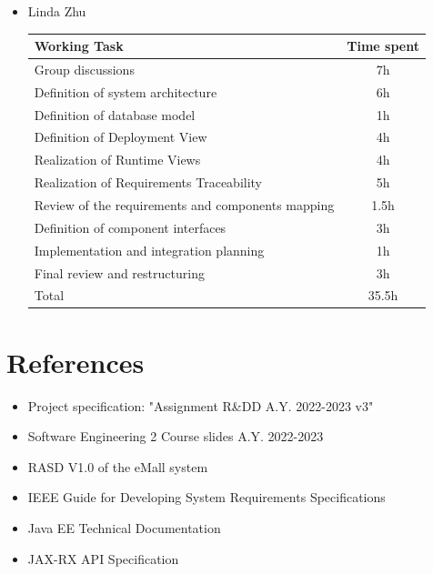 \documentclass[12pt]{article}
\begin{document}
\begin{itemize}
\newpage
    \item Linda Zhu {
    \begin{center}
    \begin{tabular}{| l | c |}
    \hline
    Working Task & Time spent \\
    \hline
    Group discussions & 7h \\
    \hline
    Definition of system architecture & 6h \\
    \hline
    Definition of database model & 1h \\
    \hline
    Definition of Deployment View & 4h \\
    \hline
    Realization of Runtime Views & 4h \\
    \hline
    Realization of Requirements Traceability & 5h \\
    \hline
    Review of the requirements and components mapping & 1.5h \\
    \hline
    Definition of component interfaces & 3h \\
    \hline
    Implementation and integration planning & 1h \\
    \hline
    Final review and restructuring & 3h \\
    \hline
    Total & 35.5h \\
    \hline
    \end{tabular}
    \end{center}
    }
\end{itemize}


\newpage
\section{References}
\begin{itemize}
    \item Project specification: "Assignment R\&DD A.Y. 2022-2023 v3"
    \item Software Engineering 2 Course slides A.Y. 2022-2023
    \item RASD V1.0 of the eMall system
    \item IEEE Guide for Developing System Requirements Specifications
    \item Java EE Technical Documentation
    \item JAX-RX API Specification
\end{itemize}
\end{document}
